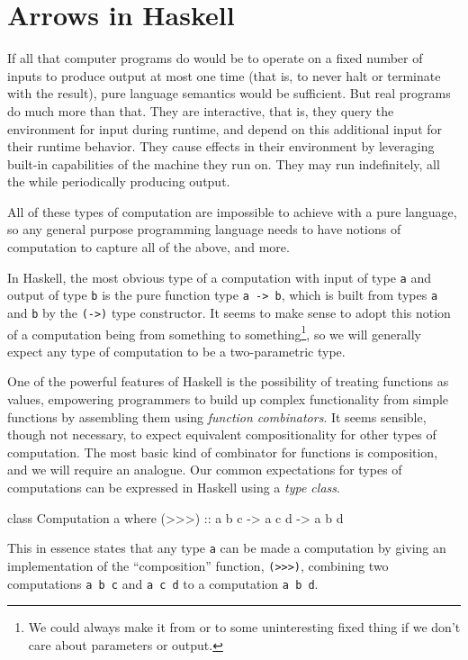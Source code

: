 \section{Arrows in Haskell}

If all that computer programs do would be to operate on a fixed number of inputs
to produce output at most one time (that is, to never halt or terminate with
the result), pure language semantics would be sufficient. But real programs do
much more than that. They are interactive, that is, they query the environment
for input during runtime, and depend on this additional input for their runtime
behavior. They cause effects in their environment by leveraging built-in
capabilities of the machine they run on. They may run indefinitely, all the
while periodically producing output.

All of these types of computation are impossible to achieve with a pure
language, so any general purpose programming language needs to have notions of
computation to capture all of the above, and more.

In Haskell, the most obvious type of a computation with input of type \verb|a|
and output of type \verb|b| is the pure function type \verb|a -> b|, which is
built from types \verb|a| and \verb|b| by the \verb|(->)| type constructor. It
seems to make sense to adopt this notion of a computation being from something
to something\footnote{We could always make it from or to some uninteresting
fixed thing if we don't care about parameters or output.}, so we will generally
expect any type of computation to be a two-parametric type.

One of the powerful features of Haskell is the possibility of treating functions
as values, empowering programmers to build up complex functionality from simple
functions by assembling them using \emph{function combinators}. It seems
sensible, though not necessary, to expect equivalent compositionality for other
types of computation. The most basic kind of combinator for functions is
composition, and we will require an analogue. Our common expectations for types
of computations can be expressed in Haskell using a \emph{type class}.

\begin{code}
  class Computation a where
      (>>>) :: a b c -> a c d -> a b d
\end{code}

This in essence states that any type \verb|a| can be made a computation by
giving an implementation of the ``composition'' function, \verb|(>>>)|,
combining two computations \verb|a b c| and \verb|a c d| to a computation
\verb|a b d|.

